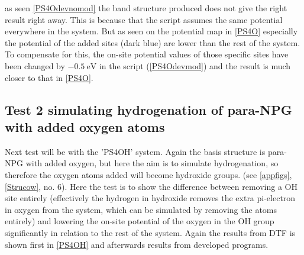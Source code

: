 as seen \cref{PS4Odevnomod} the band structure produced does not give the right result right away. This is because that the script assumes the same potential everywhere in the system. But as seen on the potential map in \cref{PS4O} especially the potential of the added sites (dark blue) are lower than the rest of the system. To compensate for this, the on-site potential values of those specific sites have been changed by \(\SI{-0.5}{\electronvolt}\) in the script (\cref{PS4Odevmod}) and the result is much closer to that in \cref{PS4O}.
\subsection{Test 2 simulating hydrogenation of para-NPG with added oxygen atoms}
Next test will be with the 'PS4OH' system. Again the basis structure is para-NPG with added oxygen, but here the aim is to simulate hydrogenation, so therefore the oxygen atoms added will become hydroxide groups. (see \cref{appfigs}, \cref{Strucow}, no. 6). Here the test is to show the difference between removing a OH site entirely (effectively the hydrogen in hydroxide removes the extra pi-electron in oxygen from the system, which can be simulated by removing the atoms entirely) and lowering the on-site potential of the oxygen in the OH group significantly in relation to the rest of the system. Again the results from DTF is shown first in \cref{PS4OH} and afterwards results from developed programs. 
